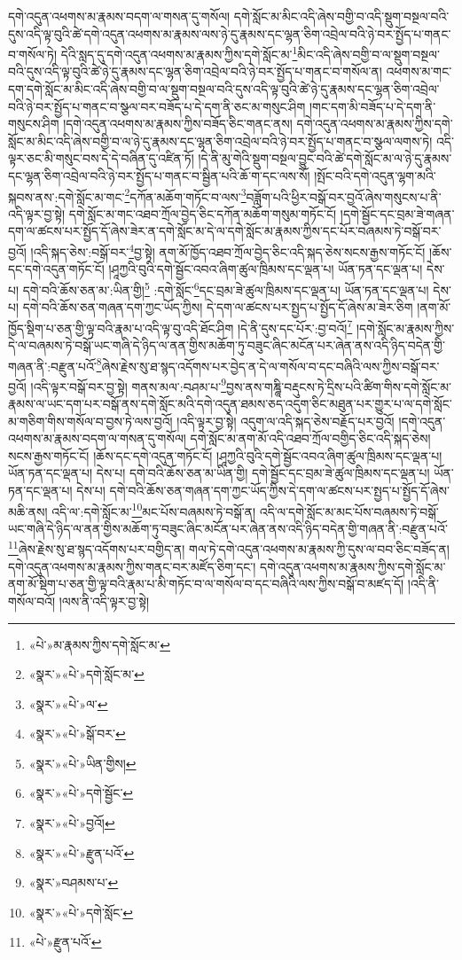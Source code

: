 དགེ་འདུན་འཕགས་མ་རྣམས་བདག་ལ་གསན་དུ་གསོལ། དགེ་སློང་མ་མིང་འདི་ཞེས་བགྱི་བ་འདི་སྡུག་བསྔལ་བའི་དུས་འདི་ལྟ་བུའི་ཚེ་དགེ་འདུན་འཕགས་མ་རྣམས་ལས་ཉེ་དུ་རྣམས་དང་ལྷན་ཅིག་འབྲེལ་བའི་ཉེ་བར་སྤྱོད་པ་གནང་བ་གསོལ་ཏེ། དེའི་སླད་དུ་དགེ་འདུན་འཕགས་མ་རྣམས་ཀྱིས་དགེ་སློང་མ་\footnote{«པེ་»མ་རྣམས་ཀྱིས་དགེ་སློང་མ་}མིང་འདི་ཞེས་བགྱི་བ་ལ་སྡུག་བསྔལ་བའི་དུས་འདི་ལྟ་བུའི་ཚེ་ཉེ་དུ་རྣམས་དང་ལྷན་ཅིག་འབྲེལ་བའི་ཉེ་བར་སྤྱོད་པ་གནང་བ་གསོལ་ན། འཕགས་མ་གང་དག་དགེ་སློང་མ་མིང་འདི་ཞེས་བགྱི་བ་ལ་སྡུག་བསྔལ་བའི་དུས་འདི་ལྟ་བུའི་ཚེ་ཉེ་དུ་རྣམས་དང་ལྷན་ཅིག་འབྲེལ་བའི་ཉེ་བར་སྤྱོད་པ་གནང་བ་སྩལ་བར་བཟོད་པ་དེ་དག་ནི་ཅང་མ་གསུང་ཤིག །གང་དག་མི་བཟོད་པ་དེ་དག་ནི་གསུངས་ཤིག །དགེ་འདུན་འཕགས་མ་རྣམས་ཀྱིས་བཟོད་ཅིང་གནང་ནས། དགེ་འདུན་འཕགས་མ་རྣམས་ཀྱིས་དགེ་སློང་མ་མིང་འདི་ཞེས་བགྱི་བ་ལ་ཉེ་དུ་རྣམས་དང་ལྷན་ཅིག་འབྲེལ་བའི་ཉེ་བར་སྤྱོད་པ་གནང་བ་སྩལ་ལགས་ཏེ། འདི་ལྟར་ཅང་མི་གསུང་བས་དེ་དེ་བཞིན་དུ་འཛིན་ཏོ། །དེ་ནི་མུ་གེའི་སྡུག་བསྔལ་བྱུང་བའི་ཚེ་དགེ་སློང་མ་ལ་ཉེ་དུ་རྣམས་དང་ལྷན་ཅིག་འབྲེལ་བའི་ཉེ་བར་སྤྱོད་པ་གནང་བ་སྦྱིན་པའི་ཆོ་ག་དང་ལས་སོ། །སྤོང་བའི་དགེ་འདུན་ལྷག་མའི་སྐབས་ནས་:དགེ་སློང་མ་གང་\footnote{«སྣར་»«པེ་»དགེ་སློང་མ་}དཀོན་མཆོག་གཏོང་བ་ལས་\footnote{«སྣར་»«པེ་»ལ་}བཟློག་པའི་ཕྱིར་བསྒོ་བར་བྱའོ་ཞེས་གསུངས་པ་ནི་འདི་ལྟར་བྱ་སྟེ། དགེ་སློང་མ་གང་འཐབ་ཀྲོལ་བྱེད་ཅིང་དཀོན་མཆོག་གསུམ་གཏོང་ངོ། །དགེ་སྦྱོང་དང་བྲམ་ཟེ་གཞན་དག་ལ་ཚངས་པར་སྤྱོད་དོ་ཞེས་ཟེར་ན་དགེ་སློང་མ་དེ་ལ་དགེ་སློང་མ་རྣམས་ཀྱིས་དང་པོར་བཞམས་ཏེ་བསྒོ་བར་བྱའོ། །འདི་སྐད་ཅེས་:བསྒོ་བར་\footnote{«སྣར་»«པེ་»སྒོ་བར་}བྱ་སྟེ། ནག་མོ་ཁྱོད་འཐབ་ཀྲོལ་བྱེད་ཅིང་འདི་སྐད་ཅེས་སངས་རྒྱས་གཏོང་ངོ། །ཆོས་དང་དགེ་འདུན་གཏོང་ངོ། །ཤཱཀྱའི་བུའི་དགེ་སྦྱོང་འབའ་ཞིག་ཚུལ་ཁྲིམས་དང་ལྡན་པ། ཡོན་ཏན་དང་ལྡན་པ། དེས་པ། དགེ་བའི་ཆོས་ཅན་མ་:ཡིན་གྱི།\footnote{«སྣར་»«པེ་»ཡིན་གྱིས།} :དགེ་སློང་\footnote{«སྣར་»«པེ་»དགེ་སྦྱོང་}དང་བྲམ་ཟེ་ཚུལ་ཁྲིམས་དང་ལྡན་པ། ཡོན་ཏན་དང་ལྡན་པ། དེས་པ། དགེ་བའི་ཆོས་ཅན་གཞན་དག་ཀྱང་ཡོད་ཀྱིས། དེ་དག་ལ་ཚངས་པར་སྤྱད་པ་སྤྱོད་དོ་ཞེས་མ་ཟེར་ཅིག །ནག་མོ་ཁྱོད་སྡིག་པ་ཅན་གྱི་ལྟ་བའི་རྣམ་པ་འདི་ལྟ་བུ་འདི་ཐོང་ཤིག །དེ་ནི་དུས་དང་པོར་:བྱ་བའོ།\footnote{«སྣར་»«པེ་»བྱའོ།} །དགེ་སློང་མ་རྣམས་ཀྱིས་དེ་ལ་བཞམས་ཏེ་བསྒོ་ཡང་གཞི་དེ་ཉིད་ལ་ནན་གྱིས་མཆོག་ཏུ་བཟུང་ཞིང་མངོན་པར་ཞེན་ནས་འདི་ཉིད་བདེན་གྱི་གཞན་ནི་:བརྫུན་པའོ་\footnote{«སྣར་»«པེ་»རྫུན་པའོ་}ཞེས་རྗེས་སུ་ཐ་སྙད་འདོགས་པར་བྱེད་ན་དེ་ལ་གསོལ་བ་དང་བཞིའི་ལས་ཀྱིས་བསྒོ་བར་བྱའོ། །འདི་ལྟར་བསྒོ་བར་བྱ་སྟེ། གནས་མལ་:བཤམ་པ་\footnote{«སྣར་»བཤམས་པ་}བྱས་ནས་གཎྜཱི་བརྡུངས་ཏེ་དྲིས་པའི་ཚིག་གིས་དགེ་སློང་མ་རྣམས་ལ་ཡང་དག་པར་བསྒོ་ནས་དགེ་སློང་མའི་དགེ་འདུན་ཐམས་ཅད་འདུག་ཅིང་མཐུན་པར་གྱུར་པ་ལ་དགེ་སློང་མ་གཅིག་གིས་གསོལ་བ་བྱས་ཏེ་ལས་བྱའོ། །འདི་ལྟར་བྱ་སྟེ། འདུག་ལ་འདི་སྐད་ཅེས་བརྗོད་པར་བྱའོ། །དགེ་འདུན་འཕགས་མ་རྣམས་བདག་ལ་གསན་དུ་གསོལ། དགེ་སློང་མ་ནག་མོ་འདི་འཐབ་ཀྲོལ་བགྱིད་ཅིང་འདི་སྐད་ཅེས། སངས་རྒྱས་གཏོང་ངོ། །ཆོས་དང་དགེ་འདུན་གཏོང་ངོ། །ཤཱཀྱའི་བུའི་དགེ་སྦྱོང་འབའ་ཞིག་ཚུལ་ཁྲིམས་དང་ལྡན་པ། ཡོན་ཏན་དང་ལྡན་པ། དེས་པ། དགེ་བའི་ཆོས་ཅན་མ་ཡིན་གྱི། དགེ་སྦྱོང་དང་བྲམ་ཟེ་ཚུལ་ཁྲིམས་དང་ལྡན་པ། ཡོན་ཏན་དང་ལྡན་པ། དེས་པ། དགེ་བའི་ཆོས་ཅན་གཞན་དག་ཀྱང་ཡོད་ཀྱིས་དེ་དག་ལ་ཚངས་པར་སྤྱད་པ་སྤྱོད་དོ་ཞེས་མཆི་ནས། འདི་ལ་:དགེ་སློང་མ་\footnote{«སྣར་»«པེ་»དགེ་སློང་}མང་པོས་བཞམས་ཏེ་བསྒོ་ན། འདི་ལ་དགེ་སློང་མ་མང་པོས་བཞམས་ཏེ་བསྒོ་ཡང་གཞི་དེ་ཉིད་ལ་ནན་གྱིས་མཆོག་ཏུ་བཟུང་ཞིང་མངོན་པར་ཞེན་ནས་འདི་ཉིད་བདེན་གྱི་གཞན་ནི་:བརྫུན་པའོ་\footnote{«པེ་»རྫུན་པའོ་}ཞེས་རྗེས་སུ་ཐ་སྙད་འདོགས་པར་བགྱིད་ན། གལ་ཏེ་དགེ་འདུན་འཕགས་མ་རྣམས་ཀྱི་དུས་ལ་བབ་ཅིང་བཟོད་ན། དགེ་འདུན་འཕགས་མ་རྣམས་ཀྱིས་གནང་བར་མཛོད་ཅིག་དང་། དགེ་འདུན་འཕགས་མ་རྣམས་ཀྱིས་དགེ་སློང་མ་ནག་མོ་སྡིག་པ་ཅན་གྱི་ལྟ་བའི་རྣམ་པ་མི་གཏོང་བ་ལ་གསོལ་བ་དང་བཞིའི་ལས་ཀྱིས་བསྒོ་བ་མཛད་དོ། །འདི་ནི་གསོལ་བའོ། །ལས་ནི་འདི་ལྟར་བྱ་སྟེ། 